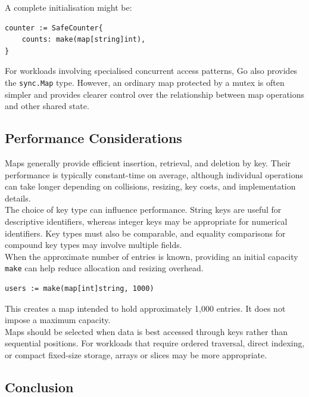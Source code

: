 A complete initialisation might be:

\begin{lstlisting}
counter := SafeCounter{
    counts: make(map[string]int),
}
\end{lstlisting}

For workloads involving specialised concurrent access
patterns, Go also provides the \texttt{sync.Map} type.
However, an ordinary map protected by a mutex is often
simpler and provides clearer control over the relationship
between map operations and other shared state.

\subsection{Performance Considerations}

Maps generally provide efficient insertion, retrieval,
and deletion by key. Their performance is typically
constant-time on average, although individual operations
can take longer depending on collisions, resizing, key
costs, and implementation details.\\

The choice of key type can influence performance.
String keys are useful for descriptive identifiers,
whereas integer keys may be appropriate for numerical
identifiers. Key types must also be comparable, and
equality comparisons for compound key types may involve
multiple fields.\\

When the approximate number of entries is known, providing
an initial capacity \texttt{make} can help reduce
allocation and resizing overhead.

\begin{lstlisting}
users := make(map[int]string, 1000)
\end{lstlisting}

This creates a map intended to hold approximately 1,000
entries. It does not impose a maximum capacity.\\

Maps should be selected when data is best accessed through
keys rather than sequential positions. For workloads that
require ordered traversal, direct indexing, or compact
fixed-size storage, arrays or slices may be more appropriate.

\subsection{Conclusion}

